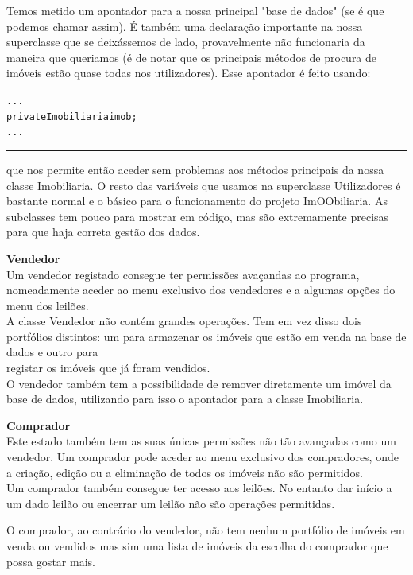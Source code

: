 \documentclass[12pt]{article}
\newenvironment{code}                    
{\textbf{
} \hspace{1cm} \hrulefill \\ 
\smallskip 
\begin{center}
\begin{minipage}{0.9\textwidth} 
\begin{alltt}\small}
{\end{alltt}
\end{minipage}
\end{center}
\hrule\smallskip
}
\begin{document}
Temos metido um apontador para a nossa principal "base de dados" (se é que podemos chamar assim). 
É também uma declaração importante na nossa superclasse que se deixássemos de lado, provavelmente não funcionaria da maneira que queriamos (é de notar que os principais métodos de procura de imóveis estão quase todas nos utilizadores).
\newline
Esse apontador é feito usando:
\newline
\begin{code}
...
    private Imobiliaria imob;
...
\end{code}
que nos permite então aceder sem problemas aos métodos principais da nossa classe Imobiliaria.
\newline
O resto das variáveis que usamos na superclasse Utilizadores é bastante normal e o básico para o funcionamento do projeto ImOObiliaria.
\newline
As subclasses tem pouco para mostrar em código, mas são extremamente precisas para que haja correta gestão dos dados.
\pagebreak

\textbf{Vendedor}
~\\

Um vendedor registado consegue ter permissões avaçandas ao programa, nomeadamente aceder ao menu exclusivo dos vendedores e a algumas opções do menu dos leilões. \\

A classe Vendedor não contém grandes operações. Tem em vez disso dois portfólios distintos: um para armazenar os imóveis que estão em venda na base de dados e outro para\\
registar os imóveis que já foram vendidos.
~\\

O vendedor também tem a possibilidade de remover diretamente um imóvel da base de dados, utilizando para isso o apontador para a classe Imobiliaria.


\textbf{Comprador}
~\\

Este estado também tem as suas únicas permissões não tão avançadas como um vendedor. Um comprador pode aceder ao menu exclusivo dos compradores, 
onde a criação, edição ou a eliminação de todos os imóveis não são permitidos.
\\

Um comprador também consegue ter acesso aos leilões. No entanto dar início a um dado leilão ou encerrar um leilão não são operações permitidas.

O comprador, ao contrário do vendedor, não tem nenhum portfólio de imóveis em venda ou vendidos mas sim uma lista de imóveis da escolha do comprador que possa gostar mais.
\\
\end{document}
